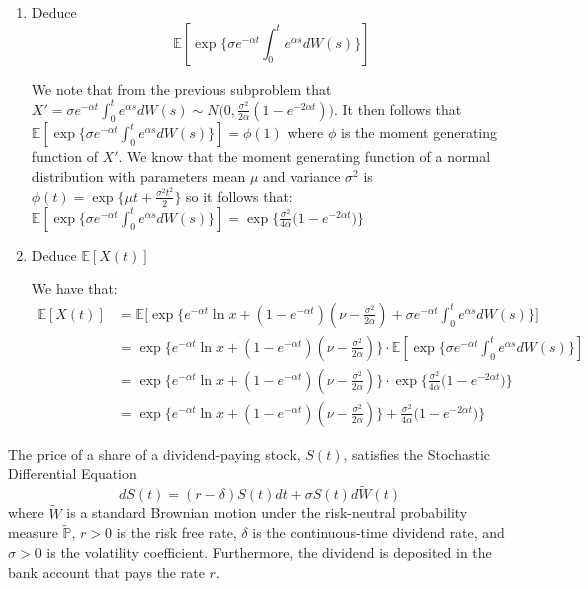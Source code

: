 \documentclass[12pt,twoside, letter]{exam}
\theoremstyle{definition}
\newcommand{\ee}{\mathbb{E}}
\newcommand{\pp}{\mathbb{P}}
\begin{document}
\begin{enumerate}
\begin{solution}
      \end{solution}
    \item Deduce
      \begin{equation*}
        \ee[\exp\{\sigma e^{-\alpha t} \int^t_0 e^{\alpha s} dW(s)\}]
      \end{equation*}
      \begin{solution}
        We note that from the previous subproblem that $X' = \sigma e^{-\alpha t}\int^t_0 e^{\alpha s}dW(s) \sim N\big(0, \frac{\sigma^2}{2\alpha}(1 - e^{-2\alpha t}) \big)$.
        It then follows that $\ee[\exp\{\sigma e^{-\alpha t} \int^t_0 e^{\alpha s} dW(s)\}] = \phi(1)$ where $\phi$ is the moment generating function of $X'$.
        We know that the moment generating function of a normal distribution with parameters mean $\mu$ and variance $\sigma^2$ is
        $\phi(t) = \exp\{\mu t + \frac{\sigma^2 t^2}{2}\}$ so it follows that: \\
        $\ee[\exp\{\sigma e^{-\alpha t} \int^t_0 e^{\alpha s} dW(s)\}] = \exp\{\frac{\sigma^2}{4\alpha}\big(1 - e^{-2\alpha t} \big) \}$
      \end{solution}
    \item Deduce $\ee[X(t)]$
      \begin{solution}
        We have that:
          \begin{align*}
            \ee[X(t)]
            &= \ee\bigg[\exp\bigg\{e^{-\alpha t}\ln{x} + (1 - e^{-\alpha t})(\nu - \frac{\sigma^2}{2\alpha}) + \sigma e^{-\alpha t}\int^t_0  e^{\alpha s} dW(s) \bigg\}\bigg] \\
            &= \exp\{e^{-\alpha t}\ln{x}+(1 - e^{-\alpha t})(\nu - \frac{\sigma^2}{2\alpha})\}\cdot\ee[\exp\{\sigma e^{-\alpha t} \int^t_0 e^{\alpha s} dW(s)\}] \\
            &= \exp\{e^{-\alpha t}\ln{x}+(1 - e^{-\alpha t})(\nu - \frac{\sigma^2}{2\alpha})\}\cdot\exp\{\frac{\sigma^2}{4\alpha}\big(1 - e^{-2\alpha t} \big) \} \\
            &= \exp\{e^{-\alpha t}\ln{x}+(1 - e^{-\alpha t})(\nu - \frac{\sigma^2}{2\alpha})\}+\frac{\sigma^2}{4\alpha}\big(1 - e^{-2\alpha t} \big)\}
          \end{align*}
      \end{solution}
  \end{enumerate}

  \par{The price of a share of a dividend-paying stock, $S(t)$, satisfies the Stochastic Differential Equation}
  \begin{equation*}
    dS(t) = (r-\delta)S(t)dt + \sigma S(t)d\tilde{W}(t)
  \end{equation*}
  where $\tilde{W}$ is a standard Brownian motion under the risk-neutral probability measure $\tilde{\pp}$, $r > 0$ is the risk free rate,
  $\delta$ is the continuous-time dividend rate, and $\sigma > 0$ is the volatility coefficient. Furthermore, the dividend is deposited in the bank account that
  pays the rate $r$.
\end{document}
